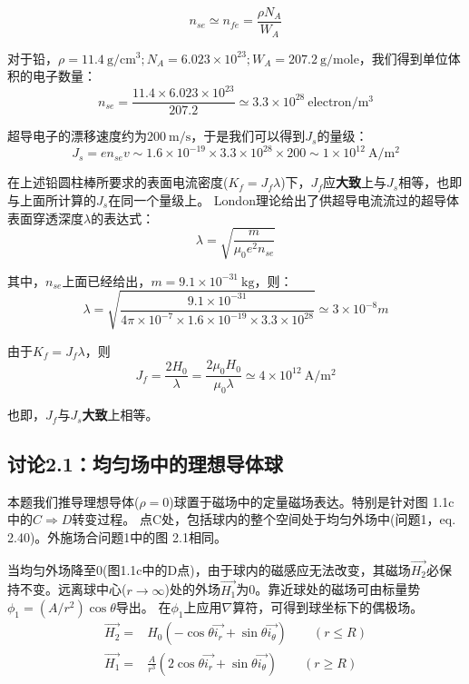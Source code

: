 \begin{equation*}
n_{se}\simeq n_{fe}=\frac{\rho N_A}{W_A} \tag{1.2}
\end{equation*}

对于铅，$\rho=11.4\ \mathrm{g/cm^3};N_A=6.023\times 10^{23};W_A=207.2\ \mathrm{g/mole}$，我们得到单位体积的电子数量：
\begin{equation*}
n_{se}=\frac{11.4\times 6.023\times 10^{23}}{207.2} \simeq 3.3\times 10^{28}\ \mathrm{electron/m^3} \tag{S2.7}
\end{equation*}

超导电子的漂移速度约为$200\ \mathrm{m/s}$，于是我们可以得到$J_s$的量级：
$$
J_s=e n_{se} v\sim 1.6\times 10^{-19} \times 3.3\times 10^{28} \times 200 \sim 1\times 10^{12}\ \mathrm{A/m^2} 
$$

在上述铅圆柱棒所要求的表面电流密度($K_f=J_f \lambda$)下，$J_f$应\textbf{大致}上与$J_s$相等，也即与上面所计算的$J_s$在同一个量级上。
London理论给出了供超导电流流过的超导体表面穿透深度$\lambda$的表达式：
\begin{equation*}
\lambda=\sqrt{\frac{m}{\mu_0 e^2 n_{se}}} \tag{1.1}
\end{equation*}

其中，$n_{se}$上面已经给出，$m=9.1\times 10^{-31}\ \mathrm{kg}$，则：
$$
\lambda=\sqrt{\frac{9.1\times 10^{-31}}{4\pi \times 10^{-7}\times 1.6\times 10^{-19}\times 3.3\times 10^{28}}}\simeq 3\times 10^{-8} m
$$

由于$K_f=J_f\lambda$，则
\begin{equation*}
J_f=\frac{2H_0}{\lambda}=\frac{2\mu_0 H_0}{\mu_0 \lambda}\simeq 4\times 10^{12} \ \mathrm{A/m^2}  \tag{S2.9}
\end{equation*}

也即，$J_f$与$J_s$\textbf{大致}上相等。




\subsection{讨论2.1：均匀场中的理想导体球}
本题我们推导理想导体($\rho=0$)球置于磁场中的定量磁场表达。特别是针对图 1.1c中的$C\Rightarrow D$转变过程。
点C处，包括球内的整个空间处于均匀外场中(问题1，eq. 2.40)。外施场合问题1中的图 2.1相同。

当均匀外场降至$0$(图1.1c中的D点)，由于球内的磁感应无法改变，其磁场$\vec{H_2}$必保持不变。远离球中心($r\rightarrow \infty$)处的外场$\vec{H_1}$为0。靠近球处的磁场可由标量势$\phi_1=(A/r^2)\cos\theta$导出。
在$\phi_1$上应用$\nabla$算符，可得到球坐标下的偶极场。
\begin{subequations}
	\begin{align}
\vec{H_2}=&H_0 (-\cos\theta \vec{i_r}+\sin\theta \vec{i_\theta})  \qquad(r\le R) \\
\vec{H_1}=&\frac{A}{r^3}(2\cos\theta \vec{i_r}+\sin\theta \vec{i_\theta})\qquad  (r\ge R)
	\end{align}
\end{subequations}


